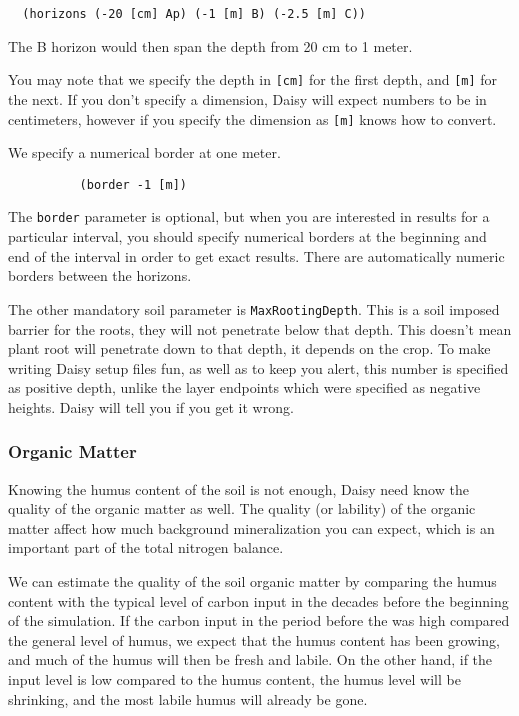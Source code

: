 \documentclass[a4paper]{article}
\begin{document}
\begin{verbatim}
  (horizons (-20 [cm] Ap) (-1 [m] B) (-2.5 [m] C))
\end{verbatim}

The B horizon would then span the depth from 20 cm to 1
meter.

You may note that we specify the depth in \verb|[cm]| for the first
depth, and \verb|[m]| for the next.  If you don't specify a dimension,
Daisy will expect numbers to be in centimeters, however if you
specify the dimension as \verb|[m]| knows how to convert.  

We specify a numerical border at one meter.
\begin{verbatim}
          (border -1 [m])
\end{verbatim}
The \texttt{border} parameter is optional, but when you are interested
in results for a particular interval, you should specify numerical
borders at the beginning and end of the interval in order to get exact
results.  There are automatically numeric borders between the horizons.

The other mandatory soil parameter is \texttt{MaxRootingDepth}.  This
is a soil imposed barrier for the roots, they will not penetrate below
that depth.  This doesn't mean plant root will penetrate down to that
depth, it depends on the crop.  To make writing Daisy setup files
fun, as well as to keep you alert, this number is specified as
positive depth, unlike the layer endpoints which were specified as
negative heights.  Daisy will tell you if you get it wrong.

\subsubsection{Organic Matter}
\label{ex:om}

Knowing the humus content of the soil is not enough, Daisy need know
the quality of the organic matter as well.  The quality (or lability)
of the organic matter affect how much background mineralization you
can expect, which is an important part of the total nitrogen balance.

We can estimate the quality of the soil organic matter by comparing
the humus content with the typical level of carbon input in the
decades before the beginning of the simulation.  If the carbon input
in the period before the was high compared the general level of humus,
we expect that the humus content has been growing, and much of the
humus will then be fresh and labile.  On the other hand, if the input
level is low compared to the humus content, the humus level will be
shrinking, and the most labile humus will already be gone.
\end{document}
